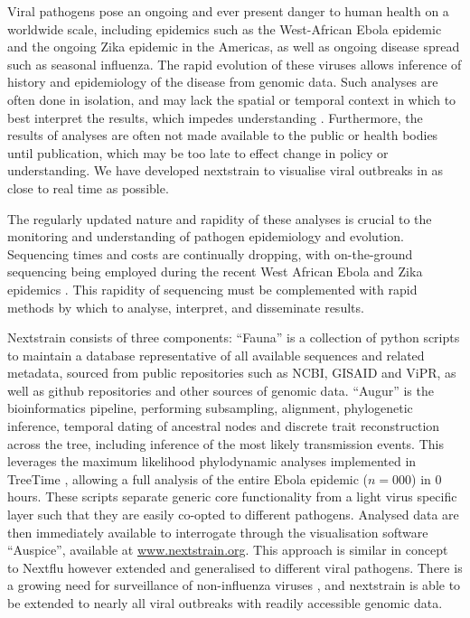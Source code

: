 \documentclass{bioinfo}
\begin{document}
\maketitle

Viral pathogens pose an ongoing and ever present danger to human health on a worldwide scale, including epidemics such as the West-African Ebola epidemic and the ongoing Zika epidemic in the Americas, as well as ongoing disease spread such as seasonal influenza.
The rapid evolution of these viruses allows inference of history and epidemiology of the disease from genomic data.
Such analyses are often done in isolation, and may lack the spatial or temporal context in which to best interpret the results, which impedes understanding \citep{pybus2013evolutionary}.
Furthermore, the results of analyses are often not made available to the public or health bodies until publication, which may be too late to effect change in policy or understanding.
We have developed nextstrain to visualise viral outbreaks in as close to real time as possible.


The regularly updated nature and rapidity of these analyses is crucial to the monitoring and understanding of pathogen epidemiology and evolution.
Sequencing times and costs are continually dropping, with on-the-ground sequencing being employed during the recent West African Ebola and Zika epidemics \citep{quick2016real,faria2017epidemic}.
This rapidity of sequencing must be complemented with rapid methods by which to analyse, interpret, and disseminate results.


Nextstrain consists of three components:
``Fauna'' is a collection of python scripts to maintain a database representative of all available sequences and related metadata, sourced from public repositories such as NCBI, GISAID and ViPR, as well as github repositories and other sources of genomic data. ``Augur'' is the bioinformatics pipeline, performing subsampling, alignment, phylogenetic inference, temporal dating of ancestral nodes and discrete trait reconstruction across the tree, including inference of the most likely transmission events.
This leverages the maximum likelihood phylodynamic analyses implemented in TreeTime \citep{sagulenko2017treetime}, allowing a full analysis of the entire Ebola epidemic ($n=000$) in 0 hours.
These scripts separate generic core functionality from a light virus specific layer such that they are easily co-opted to different pathogens.
Analysed data are then immediately available to interrogate through the visualisation software ``Auspice'', available at \href{www.nextstrain.org}{www.nextstrain.org}.
This approach is similar in concept to Nextflu \citep{neher2015nextflu} however extended and generalised to different viral pathogens.
There is a growing need for surveillance of non-influenza viruses \citep{tang2017global}, and nextstrain is able to be extended to nearly all viral outbreaks with readily accessible genomic data.
\end{document}
